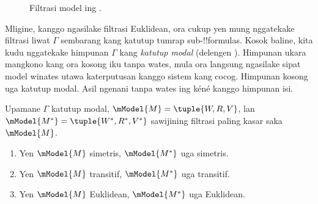 \documentclass[../../../include/open-logic-section]{subfiles}
\begin{document}
\begin{figure}[ht]
  \centering
  \caption{Filtrasi model ing .}
\end{figure}

Mligine, kanggo ngasilake filtrasi Euklidean, ora cukup yen mung
nggatekake filtrasi liwat $\Gamma$ sembarang kang katutup tumrap
sub-!!{formula}s. Kosok baline, kita kudu nggatekake himpunan $\Gamma$
kang \emph{katutup modal} (delengen ).
Himpunan ukara mangkono kang ora kosong iku tanpa wates, mula ora langsung ngasilake
sipat model winates utawa katerputusan kanggo sistem kang cocog. Himpunan kosong uga katutup modal. Asil ngenani tanpa wates ing kéné kanggo himpunan isi.

\begin{thm}
  Upamane $\Gamma$ katutup modal, $\mModel{M}=\tuple{W,R,V}$,
  lan $\mModel{M^*} = \tuple{W^*,R^*,V^*}$ sawijining filtrasi paling
  kasar saka $\mModel{M}$.
  \begin{enumerate}
  \item Yen $\mModel{M}$ simetris, $\mModel{M^*}$ uga simetris.
  \item Yen $\mModel{M}$ transitif, $\mModel{M^*}$ uga transitif.
  \item Yen $\mModel{M}$ Euklidean, $\mModel{M^*}$ uga Euklidean.
  \end{enumerate}
\end{thm}
\end{document}
